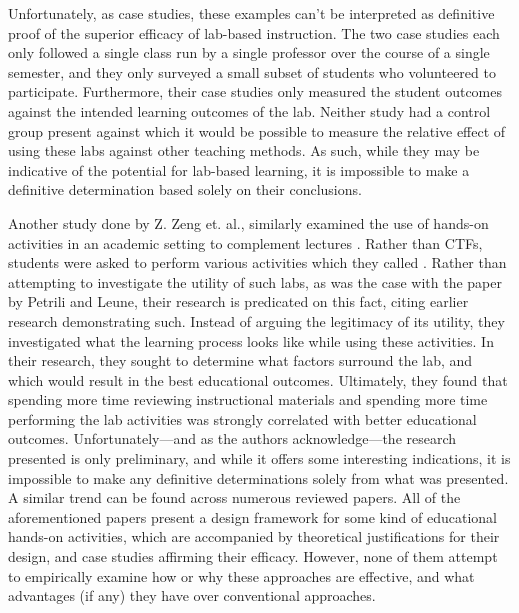 \documentclass{article}
\begin{document}
    Unfortunately, as case studies, these examples can’t be interpreted as definitive proof of the superior efficacy of lab-based instruction. 
    The two case studies each only followed a single class run by a single professor over the course of a single semester, and they only surveyed a small subset of students who volunteered to participate. 
    Furthermore, their case studies only measured the student outcomes against the intended learning outcomes of the lab. 
    Neither study had a control group present against which it would be possible to measure the relative effect of using these labs against other teaching methods. 
    As such, while they may be indicative of the potential for lab-based learning, it is impossible to make a definitive determination based solely on their conclusions.

    Another study done by Z. Zeng et. al., similarly examined the use of hands-on activities in an academic setting to complement lectures \cite{Z-Zeng}. 
    Rather than CTFs, students were asked to perform various activities which they called . 
    Rather than attempting to investigate the utility of such labs, as was the case with the paper by Petrili and Leune, their research is predicated on this fact, citing earlier research demonstrating such. 
    Instead of arguing the legitimacy of its utility, they investigated what the learning process looks like while using these activities. 
    In their research, they sought to determine what factors surround the lab, and which would result in the best educational outcomes. 
    Ultimately, they found that spending more time reviewing instructional materials and spending more time performing the lab activities was strongly correlated with better educational outcomes. 
    Unfortunately---and as the authors acknowledge---the research presented is only preliminary, and while it offers some interesting indications, it is impossible to make any definitive determinations solely from what was presented. 
    A similar trend can be found across numerous reviewed papers\cite{Y-Deng,W-Du,N-Eliot}. 
    All of the aforementioned papers present a design framework for some kind of educational hands-on activities, which are accompanied by theoretical justifications for their design, and case studies affirming their efficacy. 
    However, none of them attempt to empirically examine how or why these approaches are effective, and what advantages (if any) they have over conventional approaches. 
\end{document}
